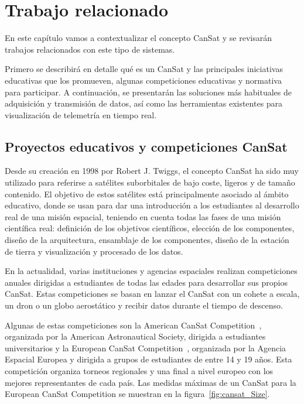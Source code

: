 \chapter{Trabajo relacionado}
\label{cap:trabajorRelacionado}
En este capítulo vamos a contextualizar el concepto CanSat y se revisarán trabajos relacionados con este tipo de sistemas.

Primero se describirá en detalle qué es un CanSat y las principales iniciativas educativas que los promueven,
algunas competiciones educativas y normativa para participar.
%
A continuación, se presentarán las soluciones más habituales de adquisición y transmisión de datos, así como las herramientas existentes para visualización de telemetría en tiempo real.


\section{Proyectos educativos y competiciones CanSat}
Desde su creación en 1998 por Robert J. Twiggs, el concepto CanSat ha sido muy utilizado para referirse a satélites suborbitales de bajo coste,
ligeros y de tamaño contenido.
El objetivo de estos satélites está principalmente asociado al ámbito educativo, donde se usan para dar una introducción a los estudiantes al desarrollo real de una misión espacial,
teniendo en cuenta todas las fases de una misión científica real: definición de los objetivos científicos, elección de los componentes, diseño de la arquitectura, ensamblaje de los componentes,
diseño de la estación de tierra y visualización y procesado de los datos.

En la actualidad, varias instituciones y agencias espaciales realizan competiciones anuales dirigidas a estudiantes de todas las edades para desarrollar sus propios CanSat.
Estas competiciones se basan en lanzar el CanSat con un cohete a escala, un dron o un globo aerostático y recibir datos durante el tiempo de descenso.

Algunas de estas competiciones son la American CanSat Competition~\cite{cansatcompetition2025}, organizada por la American Astronautical Society, dirigida a estudiantes universitarios
y la European CanSat Competition~\cite{esa_cansat2025}, organizada por la Agencia Espacial Europea y dirigida a grupos de estudiantes de entre 14 y 19 años.
Esta competición organiza torneos regionales y una final a nivel europeo con los mejores representantes de cada país.
Las medidas máximas de un CanSat para la European CanSat Competition se muestran en la figura~\ref{fig:cansat_Size}. 


